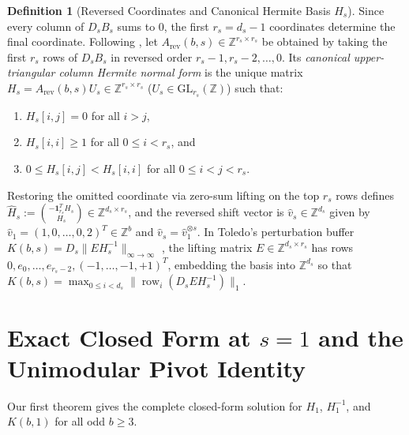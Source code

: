 \documentclass[11pt,a4paper]{article}
\theoremstyle{plain}
\theoremstyle{definition}
\newtheorem{definition}[theorem]{Definition}
\newcommand{\Z}{\mathbb{Z}}
\newcommand{\row}{\operatorname{row}}
\newcommand{\rev}{\operatorname{rev}}
\begin{document}
\begin{definition}[Reversed Coordinates and Canonical Hermite Basis $H_s$]\label{def:H_s}
Since every column of $D_s B_s$ sums to $0$, the first $r_s = d_s - 1$ coordinates determine the final coordinate. Following \cite{Toledo26}, let $A_{\rev}(b,s) \in \Z^{r_s \times r_s}$ be obtained by taking the first $r_s$ rows of $D_s B_s$ in reversed order $r_s - 1, r_s - 2, \dots, 0$. Its \emph{canonical upper-triangular column Hermite normal form} is the unique matrix $H_s = A_{\rev}(b,s) U_s \in \Z^{r_s \times r_s}$ ($U_s \in \mathrm{GL}_{r_s}(\Z)$) such that:
\begin{enumerate}[nosep]
\item $H_s[i,j] = 0$ for all $i > j$,
\item $H_s[i,i] \ge 1$ for all $0 \le i < r_s$, and
\item $0 \le H_s[i,j] < H_s[i,i]$ for all $0 \le i < j < r_s$.
\end{enumerate}
Restoring the omitted coordinate via zero-sum lifting on the top $r_s$ rows defines $\hat{H}_s := \binom{-\mathbf{1}_{r_s}^T H_s}{H_s} \in \Z^{d_s \times r_s}$, and the reversed shift vector is $\hat{v}_s \in \Z^{d_s}$ given by $\hat{v}_1 = (1, 0, \dots, 0, 2)^T \in \Z^b$ and $\hat{v}_s = \hat{v}_1^{\otimes s}$. In Toledo's perturbation buffer $K(b,s) = D_s \|E H_s^{-1}\|_{\infty \to \infty}$ \cite{Toledo26}, the lifting matrix $E \in \Z^{d_s \times r_s}$ has rows $0, e_0, \dots, e_{r_s-2}, (-1,\dots,-1,+1)^T$, embedding the basis into $\Z^{d_s}$ so that $K(b,s) = \max_{0 \le i < d_s} \|\row_i(D_s E H_s^{-1})\|_1$.
\end{definition}

\section{Exact Closed Form at \texorpdfstring{$s = 1$}{s = 1} and the Unimodular Pivot Identity}

Our first theorem gives the complete closed-form solution for $H_1$, $H_1^{-1}$, and $K(b,1)$ for all odd $b \ge 3$.
\end{document}

